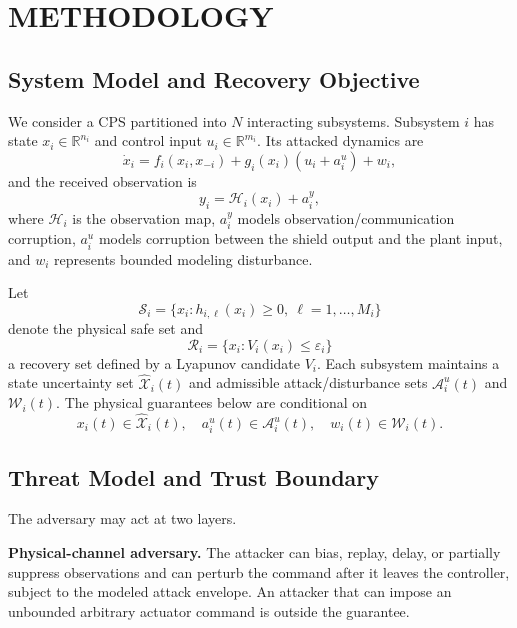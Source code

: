 \section{METHODOLOGY}

\subsection{System Model and Recovery Objective}
We consider a CPS partitioned into $N$ interacting subsystems. Subsystem $i$ has state $x_i\in\mathbb R^{n_i}$ and control input $u_i\in\mathbb R^{m_i}$. Its attacked dynamics are
\begin{equation}
\dot x_i=f_i(x_i,x_{-i})+g_i(x_i)(u_i+a_i^u)+w_i,
\label{eq:dynamics}
\end{equation}
and the received observation is
\begin{equation}
y_i=\mathcal H_i(x_i)+a_i^y,
\label{eq:obs}
\end{equation}
where $\mathcal H_i$ is the observation map, $a_i^y$ models observation/communication corruption, $a_i^u$ models corruption between the shield output and the plant input, and $w_i$ represents bounded modeling disturbance.

Let
\begin{equation}
\mathcal S_i=\{x_i:h_{i,\ell}(x_i)\ge0,\ \ell=1,\ldots,M_i\}
\end{equation}
denote the physical safe set and
\begin{equation}
\mathcal R_i=\{x_i:V_i(x_i)\le\varepsilon_i\}
\end{equation}
a recovery set defined by a Lyapunov candidate $V_i$. Each subsystem maintains a state uncertainty set $\widehat{\mathcal X}_i(t)$ and admissible attack/disturbance sets $\mathcal A_i^u(t)$ and $\mathcal W_i(t)$. The physical guarantees below are conditional on
\begin{equation}
x_i(t)\in\widehat{\mathcal X}_i(t),\quad
a_i^u(t)\in\mathcal A_i^u(t),\quad
w_i(t)\in\mathcal W_i(t).
\label{eq:coverage}
\end{equation}

\subsection{Threat Model and Trust Boundary}
The adversary may act at two layers.

\textbf{Physical-channel adversary.}
The attacker can bias, replay, delay, or partially suppress observations and can perturb the command after it leaves the controller, subject to the modeled attack envelope. An attacker that can impose an unbounded arbitrary actuator command is outside the guarantee.

